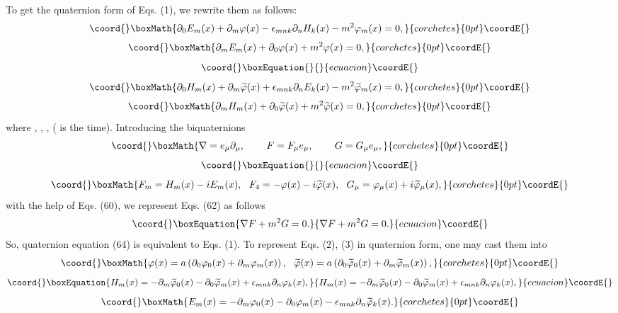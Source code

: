 \documentclass[a4paper,12pt]{article}
\begin{document}
To get the quaternion form of Eqs. (1), we rewrite them as
follows:
\[\coord{}\boxMath{
\partial _0 E_m(x)+\partial _m \varphi (x)-\epsilon_{mnk}\partial_n H_k (x)
 -m^2\varphi _m (x)=0 ,
}{corchetes}{0pt}\coordE{}\]
\[\coord{}\boxMath{
\partial _m E_m(x)+\partial _0 \varphi (x)+m^2\varphi (x)=0 ,
}{corchetes}{0pt}\coordE{}\]
\vspace{-7mm}
\begin{equation}\coord{}\boxEquation{
\label{62}
}{
}{ecuacion}\coordE{}\end{equation}
\vspace{-7mm}
\[\coord{}\boxMath{
\partial _0 H_m(x)+\partial _m \widetilde{\varphi}(x)+\epsilon_{mnk}
\partial_n E_k (x)-m^2\widetilde{\varphi} _m (x)=0 ,
}{corchetes}{0pt}\coordE{}\]
\[\coord{}\boxMath{
\partial _m H_m(x)+\partial _0 \widetilde{\varphi}
(x)+m^2\widetilde{\varphi}(x)=0 ,
}{corchetes}{0pt}\coordE{}\]
where \coordHE{}, \coordHE{}, \coordHE{}, \coordHE{} (\coordHE{} is the time).
Introducing the biquaternions
\[\coord{}\boxMath{
\nabla =e_\mu \partial _\mu ,\hspace{0.3in}F=F_\mu e_\mu
,\hspace{0.3in} G=G_\mu e_\mu ,
}{corchetes}{0pt}\coordE{}\]
\vspace{-7mm}
\begin{equation}\coord{}\boxEquation{
\label{63}
}{
}{ecuacion}\coordE{}\end{equation}
\vspace{-7mm}
\[\coord{}\boxMath{
F_m=H_m (x)-iE_m (x) ,~~F_4=-\varphi (x)-i\widetilde{\varphi}
(x),~~G_\mu =\varphi_\mu (x)+i\widetilde{\varphi}_\mu (x) ,
}{corchetes}{0pt}\coordE{}\]
with the help of Eqs. (60), we represent Eqs. (62) as follows
\begin{equation}\coord{}\boxEquation{
\nabla F+m^2G=0 .   \label{64}
}{
\nabla F+m^2G=0 .   }{ecuacion}\coordE{}\end{equation}
So, quaternion equation (64) is equivalent to Eqs. (1). To
represent Eqs. (2), (3) in quaternion form, one may cast them into
\[\coord{}\boxMath{
\varphi (x)=a\left(\partial _0 \varphi_0 (x)+\partial_m \varphi _m
(x)\right) ,~~\widetilde{\varphi} (x)=a\left(\partial _0
\widetilde{\varphi}_0 (x)+\partial_m \widetilde{\varphi} _m
(x)\right) ,
}{corchetes}{0pt}\coordE{}\]
\begin{equation}\coord{}\boxEquation{
H_m(x)=-\partial _m \widetilde{\varphi}_0 (x)-\partial_0
\widetilde{\varphi} _m (x)+\epsilon_{mnk}\partial_n \varphi_k (x)
, \label{65}
}{
H_m(x)=-\partial _m \widetilde{\varphi}_0 (x)-\partial_0
\widetilde{\varphi} _m (x)+\epsilon_{mnk}\partial_n \varphi_k (x)
, }{ecuacion}\coordE{}\end{equation}
\[\coord{}\boxMath{
E_m(x)=-\partial _m \varphi_0 (x)-\partial_0 \varphi _m
(x)-\epsilon_{mnk}\partial_n \widetilde{\varphi}_k (x) .
}{corchetes}{0pt}\coordE{}\]
\end{document}
